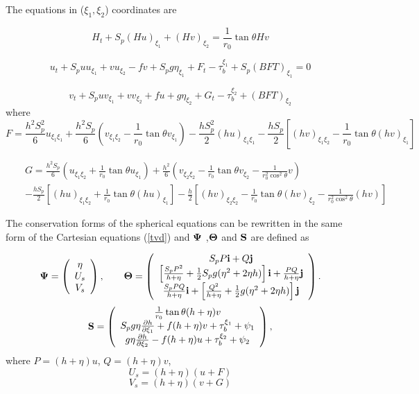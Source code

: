 \documentclass[11pt]{article}
\newcommand{\be}{\begin{equation}}
\newcommand{\ee}{\end{equation}}
\newcommand{\ba}{\begin{eqnarray}}
\newcommand{\ea}{\end{eqnarray}}
\begin{document}
The equations in ($\xi_1,\xi_2$) coordinates are

\be
H_t + S_p (Hu)_{\xi_1} + (Hv)_{\xi_2} = \frac{1}{r_0} \tan \theta Hv
\ee

\be
u_t + S_p uu_{\xi_1} +vu_{\xi_2} -fv + S_p g\eta_{\xi_1} +F_t - \tau_b^{\xi_1} +  S_p (BFT)_{\xi_1} = 0
\ee

\be
v_t + S_p uv_{\xi_1} +vv_{\xi_2} +fu +g \eta_{\xi_2} +G_t -\tau_b^{\xi_2} +(BFT)_{\xi_2}
\ee
where
\be
F = \frac{h^2 S_p^2}{6} u_{\xi_1 \xi_1} + \frac{h^2 S_p}{6} (v_{\xi_1 \xi_2}- \frac{1}{r_0}\tan \theta v_{\xi_1}) 
-\frac{hS_p^2}{2} (hu)_{\xi_1 \xi_1} -\frac{hS_p}{2} \left[ (hv)_{\xi_1 \xi_2} - \frac{1}{r_0} \tan \theta (hv)_{\xi_1} \right]
\ee 

\ba
\nonumber
&&
G = \frac{h^2S_p}{6} \left(u_{\xi_1 \xi_2} +\frac{1}{r_0} \tan \theta u_{\xi_1} \right) +\frac{h^2}{6} \left( v_{\xi_2 \xi_2} 
 - \frac{1}{r_0} \tan \theta v_{\xi_2} - \frac{1}{r_0^2\cos^2 \theta} v
\right) \\
&&
-\frac{h S_p}{2} \left[ (hu)_{\xi_1 \xi_2} +\frac{1}{r_0} \tan \theta (hu)_{\xi_1}  \right] 
- \frac{h}{2} \left[ (hv)_{\xi_2 \xi_2}  
- \frac{1}{r_0} \tan \theta (hv)_{\xi_2} - \frac{1}{r_0^2 \cos^2\theta} (hv)
 \right]
\ea

  The conservation forms of the spherical equations can be rewritten in the same form of  the Cartesian equations (\ref{tvd}) and ${\bf\Psi}$ ,${\bf \Theta}$ and ${\bf S}$ are defined as


\ba
{\bf \Psi} = \left( \begin{array}{c} \eta \\
U_s \\
V_s \end{array} \right) ,
\ \ \ \  \ \  {\bf \Theta} = \left( \begin{array}{c}
S_p P {\bf i} + Q {\bf j} \\
\left[\frac{S_p P^2}{h+\eta} +\frac{1}{2}S_p g (\eta^2 + 2 \eta h) \right ] {\bf i} + \frac{P Q}{h+\eta} {\bf j} \\
\frac{S_p P Q}{h+\eta} {\bf i} + \left[\frac{Q^2}{h+\eta} +\frac{1}{2} g (\eta^2 + 2\eta h) \right] {\bf j} 
\end{array}
\right) .
\ea
\ba
{\bf S} = \left( \begin{array}{c} 
\frac{1}{r_0} \tan \theta (h+\eta) v\\
S_p g \eta \frac{\partial h}{\partial \xi_1}   +  f(h+\eta)v+ \tau_b^{\xi_1} + \psi_1  \\
g \eta \frac{\partial h}{\partial \xi_2}  - f(h+\eta)u + \tau_b^{\xi_2}  +\psi_2
\end{array}
\right) ,
\ea
where $P = (h+\eta)u$, $Q=(h+\eta)v$,
\be
U_s = (h+\eta)(u + F)
\ee
\be
V_s  = (h+\eta)(v + G)
\ee
\end{document}
